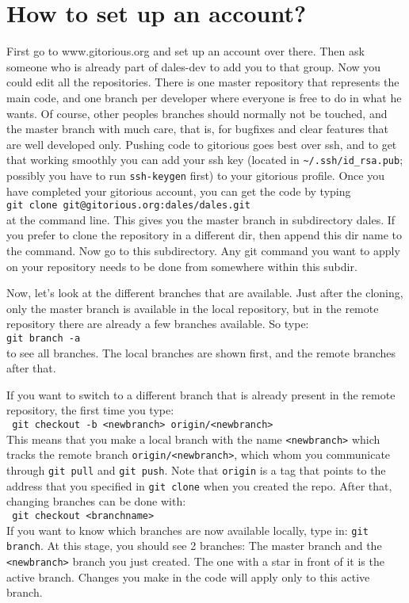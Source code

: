 \documentclass[a4paper,10pt]{article}
\begin{document}
\section{How to set up an account?}
First go to www.gitorious.org and set up an account over there. Then ask someone who is already part of dales-dev to add you to that group. Now you could edit all the repositories. There is one master repository that represents the main code, and one branch per developer where everyone is free to do in what he wants.
Of course, other peoples branches should normally not be touched, and the master branch with much care, that is, for bugfixes and clear features that are well developed only.
Pushing code to gitorious goes best over ssh, and to get that working smoothly you can add your ssh key (located in \verb|~/.ssh/id_rsa.pub|; possibly you have to run \verb|ssh-keygen| first) to your gitorious profile.
Once you have completed your gitorious account, you can get the code by typing\\  \verb|git clone git@gitorious.org:dales/dales.git|\\ at the command line. This gives you the master branch in subdirectory dales. If you prefer to clone the repository in a different dir, then append this dir name to the command. Now go to this subdirectory. Any git command you want to apply on your repository needs to be done from somewhere within this subdir.

Now, let's look at the different branches that are available. Just after the cloning, only the master branch is available in the local repository, but in the remote repository there are already a few branches available. So type: \\ \verb|git branch -a|\\ to see all branches. The local branches are shown first, and the remote branches after that.

If you want to switch to a different branch that is already present in the remote repository, the first time you type:\\
\verb| git checkout -b <newbranch> origin/<newbranch>|\\
This means that you make a local branch with the name \verb|<newbranch>| which tracks the remote branch \verb|origin/<newbranch>|, which whom you communicate through \verb|git pull| and \verb|git push|. Note that \verb|origin| is a tag that points to the address that you specified in \verb|git clone| when you created the repo.
After that, changing branches can be done with:\\
\verb| git checkout <branchname>|\\
If you want to know which branches are now available locally, type in: \verb|git branch|. At this stage, you should see 2 branches: The master branch and the \verb|<newbranch>| branch you just created. The one with a star in front of it is the active branch. Changes you make in the code will apply only to this active branch.
\end{document}
